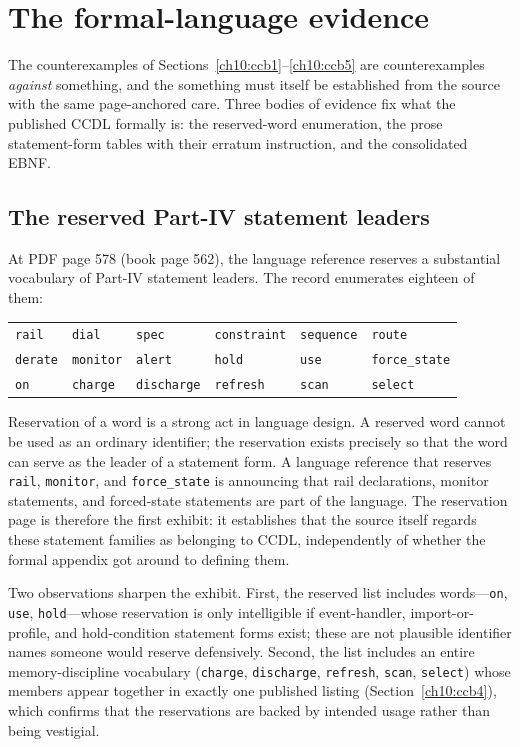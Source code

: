 \section{The formal-language evidence}\label{ch10:evidence}

The counterexamples of Sections~\ref{ch10:ccb1}--\ref{ch10:ccb5} are counterexamples \emph{against} something, and the something must itself be established from the source with the same page-anchored care. Three bodies of evidence fix what the published CCDL formally is: the reserved-word enumeration, the prose statement-form tables with their erratum instruction, and the consolidated EBNF.

\subsection{The reserved Part-IV statement leaders}\label{ch10:reserved}

At PDF page 578 (book page 562), the language reference reserves a substantial vocabulary of Part-IV statement leaders. The record enumerates eighteen of them:

\begin{center}
\begin{tabular}{@{}llllll@{}}
\toprule
\texttt{rail} & \texttt{dial} & \texttt{spec} & \texttt{constraint} & \texttt{sequence} & \texttt{route} \\
\texttt{derate} & \texttt{monitor} & \texttt{alert} & \texttt{hold} & \texttt{use} & \texttt{force\_state} \\
\texttt{on} & \texttt{charge} & \texttt{discharge} & \texttt{refresh} & \texttt{scan} & \texttt{select} \\
\bottomrule
\end{tabular}
\end{center}

Reservation of a word is a strong act in language design. A reserved word cannot be used as an ordinary identifier; the reservation exists precisely so that the word can serve as the leader of a statement form. A language reference that reserves \texttt{rail}, \texttt{monitor}, and \texttt{force\_state} is announcing that rail declarations, monitor statements, and forced-state statements are part of the language. The reservation page is therefore the first exhibit: it establishes that the source itself regards these statement families as belonging to CCDL, independently of whether the formal appendix got around to defining them.

Two observations sharpen the exhibit. First, the reserved list includes words---\texttt{on}, \texttt{use}, \texttt{hold}---whose reservation is only intelligible if event-handler, import-or-profile, and hold-condition statement forms exist; these are not plausible identifier names someone would reserve defensively. Second, the list includes an entire memory-discipline vocabulary (\texttt{charge}, \texttt{discharge}, \texttt{refresh}, \texttt{scan}, \texttt{select}) whose members appear together in exactly one published listing (Section~\ref{ch10:ccb4}), which confirms that the reservations are backed by intended usage rather than being vestigial.


